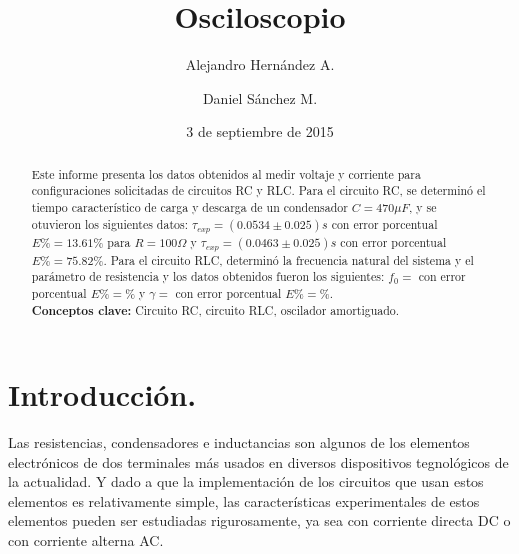 \documentclass[prb,aps,twocolumn,preprintnumbers,amsmath,amssymb]{revtex4}
\begin{document}
\title{Osciloscopio}%

\author{Alejandro Hernández A.}%
\author{Daniel Sánchez M.}%
%


\date{3 de septiembre de 2015}%

\begin{abstract}
Este informe presenta los datos obtenidos al medir voltaje y corriente para configuraciones solicitadas de circuitos RC y RLC. Para el circuito RC, se determinó el tiempo característico de carga y descarga de un condensador $C = 470 \mu F$, y se otuvieron los siguientes datos: $\tau_{exp} = (0.0534 \pm 0.025) s$ con error porcentual $E\% = 13.61 \%$ para $R = 100 \Omega$ y $\tau_{exp} = (0.0463 \pm 0.025) s$ con error porcentual $E\% = 75.82 \%$. Para el circuito RLC, determinó la frecuencia natural del sistema y el parámetro de resistencia y los datos obtenidos fueron los siguientes: $f_{0} = $ con error porcentual $E\% = \%$ y $\gamma = $ con error porcentual $E\% = \%$. 
\\

\noindent \textbf{Conceptos clave:} Circuito RC, circuito RLC, oscilador amortiguado.
\end{abstract}
                             
\maketitle

\section{Introducción.}

Las resistencias, condensadores e inductancias son algunos de los elementos electrónicos de dos terminales más usados en diversos dispositivos tegnológicos de la actualidad. Y dado a que la implementación de los circuitos que usan estos elementos es relativamente simple, las características experimentales de estos elementos pueden ser estudiadas rigurosamente, ya sea con corriente directa DC o con corriente alterna AC.\\
\end{document}
